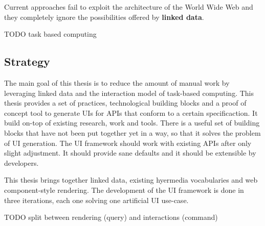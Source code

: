 Current approaches fail to exploit the architecture of the World Wide Web and they completely ignore the possibilities offered by \textbf{linked data}.

TODO task based computing

\subsection{Strategy}\label{strategy}
The main goal of this thesis is to reduce the amount of manual work by leveraging linked data and the interaction model of task-based computing.
This thesis provides a set of practices, technological building blocks and a proof of concept tool to generate UIs for APIs that conform to a certain specificaction. It build on-top of existing research, work and tools. There is a useful set of building blocks that have not been put together yet in a way, so that it solves the problem of UI generation. The UI framework should work with existing APIs after only slight adjustment. It should provide sane defaults and it should be extensible by developers.

This thesis brings together linked data, existing hyermedia vocabularies and web component-style rendering. The development of the UI framework is done in three iterations, each one solving one artificial UI use-case.

TODO split between rendering (query) and interactions (command)
